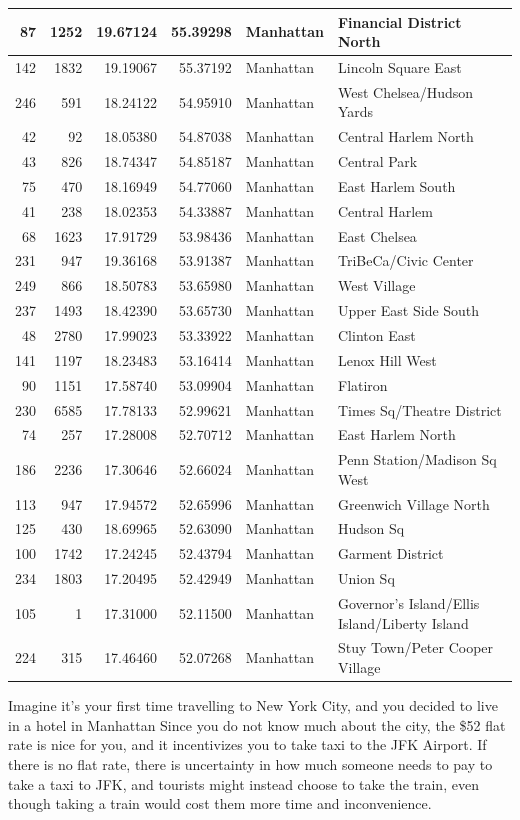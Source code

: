 \documentclass[12pt,twoside]{reedthesis}
\theoremstyle{definition}
\theoremstyle{definition}
\theoremstyle{definition}
\theoremstyle{remark}
\begin{document}
\begin{table}
\begin{tabular}[t]{r|r|r|r|l|l}
\hline
87 & 1252 & 19.67124 & 55.39298 & Manhattan & Financial District North\\
\hline
142 & 1832 & 19.19067 & 55.37192 & Manhattan & Lincoln Square East\\
\hline
246 & 591 & 18.24122 & 54.95910 & Manhattan & West Chelsea/Hudson Yards\\
\hline
42 & 92 & 18.05380 & 54.87038 & Manhattan & Central Harlem North\\
\hline
43 & 826 & 18.74347 & 54.85187 & Manhattan & Central Park\\
\hline
75 & 470 & 18.16949 & 54.77060 & Manhattan & East Harlem South\\
\hline
41 & 238 & 18.02353 & 54.33887 & Manhattan & Central Harlem\\
\hline
68 & 1623 & 17.91729 & 53.98436 & Manhattan & East Chelsea\\
\hline
231 & 947 & 19.36168 & 53.91387 & Manhattan & TriBeCa/Civic Center\\
\hline
249 & 866 & 18.50783 & 53.65980 & Manhattan & West Village\\
\hline
237 & 1493 & 18.42390 & 53.65730 & Manhattan & Upper East Side South\\
\hline
48 & 2780 & 17.99023 & 53.33922 & Manhattan & Clinton East\\
\hline
141 & 1197 & 18.23483 & 53.16414 & Manhattan & Lenox Hill West\\
\hline
90 & 1151 & 17.58740 & 53.09904 & Manhattan & Flatiron\\
\hline
230 & 6585 & 17.78133 & 52.99621 & Manhattan & Times Sq/Theatre District\\
\hline
74 & 257 & 17.28008 & 52.70712 & Manhattan & East Harlem North\\
\hline
186 & 2236 & 17.30646 & 52.66024 & Manhattan & Penn Station/Madison Sq West\\
\hline
113 & 947 & 17.94572 & 52.65996 & Manhattan & Greenwich Village North\\
\hline
125 & 430 & 18.69965 & 52.63090 & Manhattan & Hudson Sq\\
\hline
100 & 1742 & 17.24245 & 52.43794 & Manhattan & Garment District\\
\hline
234 & 1803 & 17.20495 & 52.42949 & Manhattan & Union Sq\\
\hline
105 & 1 & 17.31000 & 52.11500 & Manhattan & Governor's Island/Ellis Island/Liberty Island\\
\hline
224 & 315 & 17.46460 & 52.07268 & Manhattan & Stuy Town/Peter Cooper Village\\
\hline
\end{tabular}
\end{table}
Imagine it's your first time travelling to New York City, and you
decided to live in a hotel in Manhattan Since you do not know much about
the city, the \$52 flat rate is nice for you, and it incentivizes you to
take taxi to the JFK Airport. If there is no flat rate, there is
uncertainty in how much someone needs to pay to take a taxi to JFK, and
tourists might instead choose to take the train, even though taking a
train would cost them more time and inconvenience.
\end{document}

